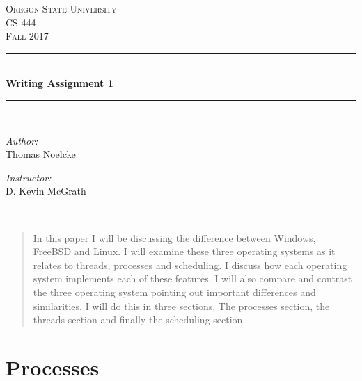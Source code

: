 \documentclass[letterpaper, onecolumn,10pt]{IEEEtran}
\begin{document}
    \begin{titlepage}
    \newcommand{\HRule}{\rule{\linewidth}{0.5mm}}
    \center
    \textsc{\Large Oregon State University}\\[1.5cm]
    \textsc{\Large CS 444}\\[0.5cm]
    \textsc{\Large Fall 2017}\\[0.5cm]
    \HRule \\[0.4cm]
    { \huge \bfseries Writing Assignment 1}\\[0.4cm] %
    \HRule \\[1.5cm]
    \begin{minipage}{0.4\textwidth}
        \begin{flushleft} \large
        \emph{Author:}\\
        Thomas Noelcke
        \end{flushleft}
    \end{minipage}
    \begin{minipage}{0.4\textwidth}
        \begin{flushright} \large
        \emph{Instructor:} \\
        D. Kevin McGrath\\
        \end{flushright}
    \end{minipage}\\[2cm]
    \begin{abstract}
			In this paper I will be discussing the difference between Windows, FreeBSD and Linux. I will examine these three operating systems as it relates to threads, processes and scheduling. I discuss how each operating system implements each of these features. I will also compare and contrast the three operating system pointing out important differences and similarities. I will do this in three sections, The processes section, the threads section and finally the scheduling section.\\
    \end{abstract}	
		\end{titlepage}
		
		
		\section{Processes}
\end{document}
